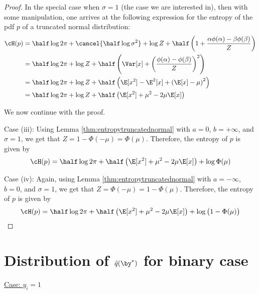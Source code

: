 \begin{proof}
In the special case when $\sigma = 1$ (the case we are interested in), then with some manipulation, one arrives at the following expression for the entropy of the pdf $p$ of a truncated normal distribution:
\begin{align*}
  \cH(p) &= \half \log 2\pi + \cancel{\half \log \sigma^2} + \log Z  + \half \left( 1 + \frac{\alpha\phi(\alpha) - \beta\phi(\beta)}{Z} \right) \\
  &=\half \log 2\pi + \log Z  + \half \left( \Var[x] + \left( \frac{\phi(\alpha) - \phi(\beta)}{Z}\right)^2 \right) \\
  &=\half \log 2\pi + \log Z  + \half \left( \E[x^2] - \E^2[x] + \left( \E[x] - \mu \right)^2 \right) \\  
  &= \half \log 2\pi + \log Z  + \half \left( \E[x^2] + \mu^2 - 2\mu\E[x] \right)
\end{align*}

We now continue with the proof.

Case (iii): Using Lemma \ref{thm:entropytruncatednormal} with $a = 0$, $b = +\infty$, and $\sigma = 1$, we get that $Z = 1 - \Phi(-\mu) = \Phi(\mu)$. Therefore, the entropy of $p$ is given by
\begin{align*}
  \cH(p) = \half \log 2\pi + \half \left( \E[x^2] + \mu^2 - 2\mu\E[x] \right) + \log \Phi(\mu) 
\end{align*}

Case (iv): Again, using Lemma \ref{thm:entropytruncatednormal} with $a = -\infty$, $b = 0$, and $\sigma = 1$, we get that $Z = \Phi(-\mu) = 1 -\Phi(\mu)$. Therefore, the entropy of $p$ is given by
\begin{align*}
  \cH(p) = \half \log 2\pi + \half \left( \E[x^2] + \mu^2 - 2\mu\E[x] \right) +  \log \big(1 - \Phi(\mu)\big)
\end{align*}

\end{proof}

\section{Distribution of $\tilde q(\by^*)$ for binary case}

\underline{Case: $y_i = 1$}

